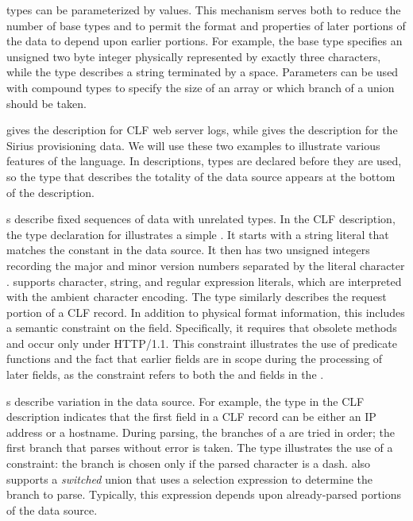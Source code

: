 \documentclass{sig-alternate}
\newcommand{\dibbler}{Sirius}
\begin{document}
\pads{} types can be parameterized by values.
This mechanism
serves both to reduce the number of base types and to permit the
format and properties of later portions of the data to depend upon earlier portions.
For example, 
the base type  specifies an unsigned two byte integer
physically represented by exactly three characters, while the type
describes a string terminated by a space.  Parameters can be 
used with compound types to specify the size of an array or which
branch of a union should be taken.




 gives the \pads{} description for CLF web server logs, 
while  gives the description for the \dibbler{} 
provisioning data.  We will use these two examples to illustrate various 
features of the \pads{} language.  In \pads{} descriptions, types are declared before they are used, so the type that describes the totality of the data source appears at the bottom of the description.

s describe fixed sequences of data with unrelated types.
In the CLF description, the type declaration for
 illustrates a simple . It starts with a 
string literal that matches the constant  in the data source.  It 
then has two unsigned integers recording the major and minor version numbers
separated by the literal character .  \pads{} supports character, string,
and regular expression literals, which are interpreted with the ambient character 
encoding. The type  
similarly describes the request portion of a CLF record.  In addition
to physical format information, this  includes a semantic constraint
on the  field.  Specifically, it requires that obsolete methods
 and  occur only under HTTP/1.1.  This constraint illustrates
the use of predicate functions and the fact 
that earlier fields are in scope during the processing of later fields, as the 
constraint
refers to both the  and  fields in the .

s describe variation in the data source.  For example, the
 type in the CLF description indicates that the first field 
in a CLF record can be either an IP address or a hostname.  During parsing, 
the branches of a  are tried in order; the first branch that 
parses without error is taken.  The  type illustrates the use
of a constraint: the branch  is chosen only if the parsed
character is a dash.  \pads{} also supports a \textit{switched} union that uses a selection expression to determine the branch to parse.  Typically, this expression depends upon already-parsed portions of the data source.
\end{document}
